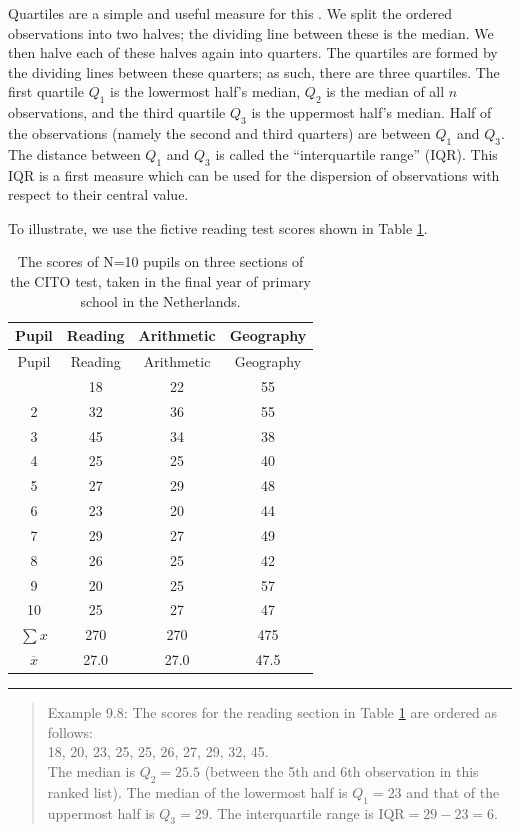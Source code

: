 \documentclass[
]{book}
\begin{document}
Quartiles are a simple and useful measure for this \citep{Tukey77}.
We split the ordered observations into two halves; the dividing line
between these is the median. We then halve each of these halves again into quarters.
The quartiles are formed by the dividing lines between these
quarters; as such, there are three quartiles. The first quartile \(Q_1\) is the lowermost half's median,
\(Q_2\) is the median of all \(n\) observations, and the third quartile \(Q_3\) is the uppermost half's median.
Half of the observations (namely the second and third quarters) are
between \(Q_1\) and \(Q_3\). The distance between \(Q_1\) and \(Q_3\) is
called the ``interquartile range'' (IQR). This IQR is a first measure which
can be used for the dispersion of observations with respect to their
central value.

To illustrate, we use the fictive reading test scores shown in Table
\ref{tab:cito}.

\begin{longtable}[]{@{}cccc@{}}
\caption{\label{tab:cito} The scores of N=10 pupils on three sections of the CITO test,
taken in the final year of primary school in the Netherlands.}\tabularnewline
\toprule\noalign{}
Pupil & Reading & Arithmetic & Geography \\
\midrule\noalign{}
\endfirsthead
\toprule\noalign{}
Pupil & Reading & Arithmetic & Geography \\
\midrule\noalign{}
\endhead
\bottomrule\noalign{}
\endlastfoot
1 & 18 & 22 & 55 \\
2 & 32 & 36 & 55 \\
3 & 45 & 34 & 38 \\
4 & 25 & 25 & 40 \\
5 & 27 & 29 & 48 \\
6 & 23 & 20 & 44 \\
7 & 29 & 27 & 49 \\
8 & 26 & 25 & 42 \\
9 & 20 & 25 & 57 \\
10 & 25 & 27 & 47 \\
\(\sum x\) & 270 & 270 & 475 \\
\(\overline{x}\) & 27.0 & 27.0 & 47.5 \\
\end{longtable}

\begin{center}\rule{0.5\linewidth}{0.5pt}\end{center}

\begin{quote}
Example 9.8:
The scores for the reading section in
Table \ref{tab:cito} are
ordered as follows:\\
18, 20, 23, 25, 25, 26, 27, 29, 32, 45.\\
The median is \(Q_2=25.5\) (between the 5th and 6th observation in this
ranked list). The median of the lowermost half is \(Q_1=23\) and that of the
uppermost half is \(Q_3=29\). The interquartile range is
\(\textrm{IQR}=29-23=6\).
\end{quote}
\end{document}
